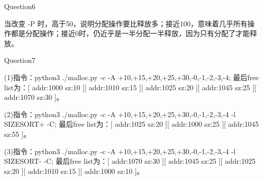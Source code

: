 \documentclass[11pt]{article}
\begin{document}
\begin{large}
	\noindent Question6\\
\end{large}
\hspace*{2em}当改变 -P 时，高于50，说明分配操作要比释放多；接近100，意味着几乎所有操作都是分配操作；接近0时，仍近乎是一半分配一半释放，因为只有分配了才能释放。\\

\begin{large}
	\noindent Question7\\
\end{large}
\hspace*{2em}(1)指令：python3 ./malloc.py -c -A +10,+15,+20,+25,+30,-0,-1,-2,-3,-4; 最后free list为：[ addr:1000 sz:10 ][ addr:1010 sz:15 ][ addr:1025 sz:20 ][ addr:1045 sz:25 ][ addr:1070 sz:30 ]。
\par(2)指令：python3 ./malloc.py -c -A +10,+15,+20,+25,+30,-0,-1,-2,-3,-4 -l SIZESORT+ -C; 最后free list为：[ addr:1025 sz:20 ][ addr:1000 sz:25 ][ addr:1045 sz:55 ]。
\par(3)指令：python3 ./malloc.py -c -A +10,+15,+20,+25,+30,-0,-1,-2,-3,-4 -l SIZESORT- -C; 最后free list为：[ addr:1070 sz:30 ][ addr:1045 sz:25 ][ addr:1025 sz:20 ][ addr:1010 sz:15 ][ addr:1000 sz:10 ]。\\
\end{document}
